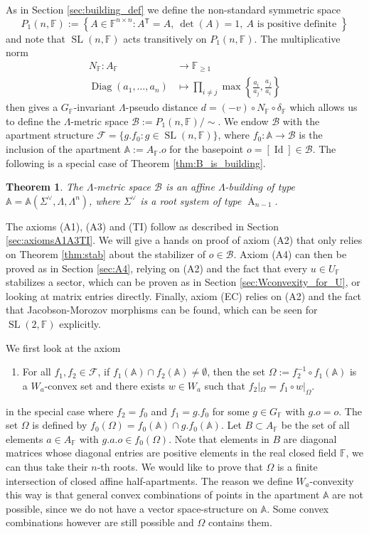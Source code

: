 \documentclass[12pt]{amsart}
\newcommand{\F}{\mathbb{F} }
\newcommand{\A}{\mathbb{A}}
\newcommand{\Fun}{\mathscr{F}} %
\newcommand{\B}{\mathcal{B}}
\newcommand{\tran}{{^{\mathsf{T}}\!}}
\numberwithin{equation}{section}
\newtheorem{theorem}{Theorem}[section]
\theoremstyle{remark} %
\begin{document}
As in Section \ref{sec:building_def} we define the non-standard symmetric space
$$
P_{1}(n,\F) := \left\{ A \in \F^{n\times n} \colon A\tran = A, \ \det(A) = 1 ,\ A \text{ is positive definite } \right\}
$$
and note that $\operatorname{SL}(n,\F)$ acts transitively on $P_1(n,\F)$. The multiplicative norm \begin{align*}
	N_\F \colon A_\F &\to \F_{\geq 1} \\
	\operatorname{Diag}(a_1, \ldots , a_n) &\mapsto \prod_{i\neq j} \max \left\{ \frac{a_i}{a_j}, \frac{a_j}{a_i}   \right\}
\end{align*}
then gives a $G_\F$-invariant $\Lambda$-pseudo distance $d  = (-v) \circ N_\F \circ \delta_\F$ which allows us to define the $\Lambda$-metric space $\B := P_1(n,\F)/\!\!\sim$. We endow $\B$ with the apartment structure $\Fun = \{ g.f_0 \colon g \in \operatorname{SL}(n,\F) \}$, where $f_0 \colon \A  \to \B$ is the inclusion of the apartment $\A := A_\F.o$ for the basepoint $o = [\operatorname{Id}] \in \B$. The following is a special case of Theorem \ref{thm:B_is_building}.
\begin{theorem}
	The $\Lambda$-metric space $\B$ is an affine $\Lambda$-building of type $\A = \A(\Sigma^\vee,\Lambda,\Lambda^n)$, where $\Sigma^\vee$ is a root system of type $\operatorname{A}_{n-1}$.
\end{theorem} 
The axioms (A1), (A3) and (TI) follow as described in Section \ref{sec:axiomsA1A3TI}. We will give a hands on proof of axiom (A2) that only relies on Theorem \ref{thm:stab} about the stabilizer of $o \in \B$. Axiom (A4) can then be proved as in Section \ref{sec:A4}, relying on (A2) and the fact that every $u \in U_\F$ stabilizes a sector, which can be proven as in Section \ref{sec:Wconvexity_for_U}, or looking at matrix entries directly. Finally, axiom (EC) relies on (A2) and the fact that Jacobson-Morozov morphisms can be found, which can be seen for $\operatorname{SL}(2,\F)$ explicitly. 

We first look at the axiom
\begin{enumerate}
	\item [(A2)] For all $f_1,f_2 \in \Fun$, if $f_1(\A)\cap f_2(\A)\neq \emptyset$, then the set $\Omega := f_2^{-1}\circ f_1(\A)$ is a $W_a$-convex set and there exists $w \in W_a$ such that $f_2|_\Omega = f_1\circ w |_\Omega$. 
\end{enumerate}
in the special case where $f_2=f_0$ and $f_1=g.f_0$ for some $g\in G_\F$ with $g.o=o$. The set $\Omega$ is defined by $f_0(\Omega)=f_0(\A)\cap g.f_0(\A)$. Let $B\subset A_\F$ be the set of all elements $a\in A_\F$ with $g.a.o\in f_0(\Omega)$. Note that elements in $B$ are diagonal matrices whose diagonal entries are positive elements in the real closed field $\F$, we can thus take their $n$-th roots. We would like to prove that $\Omega$ is a finite intersection of closed affine half-apartments. The reason we define $W_a$-convexity this way is that general convex combinations of points in the apartment $\A$ are not possible, since we do not have a vector space-structure on $\A$. Some convex combinations however are still possible and $\Omega$ contains them.  
\end{document}
